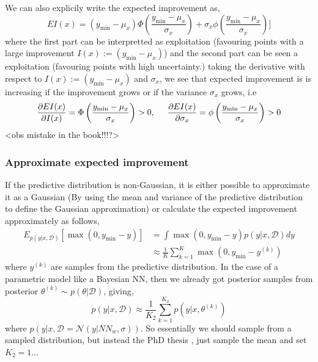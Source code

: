 We can also explicily write the expected improvement as, 
$$EI(x) = (y_{\min}-\mu_x)\Phi\left(\frac{y_{\min}-\mu_x}{\sigma_x}\right)+ \sigma_x
\phi\left(\frac{y_{\min}-\mu_x}{\sigma_x}\right)]$$
where the first part can be interpretted as exploitation (favouring points with a large improvement $I(x) := (y_{\min}-\mu_x)$)
and the second part can be seen a exploitation (favouring points with high uncertainty.)
taking the derivative with respect to $I(x) := (y_{\min}-\mu_x)$ and $\sigma_x$, we see that expected improvement is 
is increasing if the improvement grows or if the variance $\sigma_x$ grows, i.e
$$\frac{\partial EI(x)}{\partial I(x)} = \Phi\left(\frac{y_{\min}-\mu_x}{\sigma_x}\right) > 0, \hspace*{0.5cm} 
\frac{\partial EI(x)}{\partial \sigma_x} = \phi\left(\frac{y_{\min}-\mu_x}{\sigma_x}\right) >0$$ 
<obs mistake in the book!!!?>


\subsubsection{Approximate expected improvement}
If the predictive distribution is non-Gaussian, it is either possible to approximate it as a Gaussian
(By using the mean and variance of the predictive distribution to define the Gaussian approximation)
or calculate the expected improvement approximately as follows, 
\begin{align*}
    E_{p(y|x,\mathcal{D})}[\max(0,y_{\min}-y)] &= \int \max(0,y_{\min}-y) p(y|x,\mathcal{D}) dy\\
    &\approx \frac{1}{K} \sum_{k=1}^K  \max(0,y_{\min}-y^{(k)})
\end{align*}
where $y^{(k)}$ are samples from the predictive distribution. In the case of a parametric model
like a Bayesian NN, then we already got posterior samples from posterior $\theta^{(k)} \sim p(\theta | \mathcal{D})$, giving, 
$$p(y|x,\mathcal{D}) \approx \frac{1}{K_2} \sum_{k=1}^{K_2} p(y|x,\theta^{(k)})$$ where
$p(y|x,\mathcal{D} = \mathcal{N}(y|NN_w,\sigma))$. So essentially we should sample from a sampled
distribution, but instead the PhD thesis \cite{PhDthesis}, just sample the mean and set $K_2 = 1$... 



